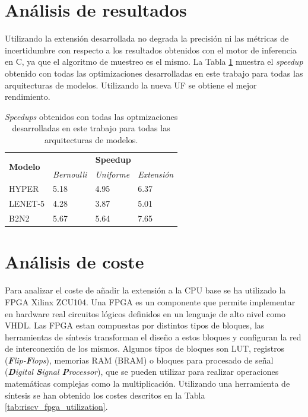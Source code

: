 
\section{Análisis de resultados}

Utilizando la extensión desarrollada no degrada la precisión ni las métricas de incertidumbre con respecto a los resultados obtenidos con el motor de inferencia en C, ya que el algoritmo de muestreo es el mismo. La Tabla \ref{tab:riscv_speedup} muestra el \textit{speedup} obtenido con todas las optimizaciones desarrolladas en este trabajo para todas las arquitecturas de modelos. Utilizando la nueva UF se obtiene el mejor rendimiento.

\begin{table}[h]
    \centering
    \caption{\textit{Speedups} obtenidos con todas las optmizaciones desarrolladas en este trabajo para todas las arquitecturas de modelos.}
    \label{tab:riscv_speedup}
    \begin{tabular}{llll}
    \hline
    \multirow{2}{*}{\textbf{Modelo}} & \multicolumn{3}{c}{\textbf{Speedup}}\\
    & \textit{Bernoulli} & \textit{Uniforme} & \textit{Extensión}\\ \hline
    HYPER& 5.18 & 4.95 & 6.37 \\
    LENET-5& 4.28 & 3.87 & 5.01 \\
    B2N2& 5.67 & 5.64 & 7.65 \\ \hline
    \end{tabular}
\end{table}

\section{Análisis de coste}

Para analizar el coste de añadir la extensión a la CPU base se ha utilizado la FPGA Xilinx ZCU104. Una FPGA es un componente que permite implementar en hardware real circuitos lógicos definidos en un lenguaje de alto nivel como VHDL. Las FPGA estan compuestas por distintos tipos de bloques, las herramientas de síntesis transforman el diseño a estos bloques y configuran la red de interconexión de los mismos. Algunos tipos de bloques son LUT, registros (\textit{\textbf{F}lip-\textbf{F}lops}), memorias RAM (BRAM) o bloques para procesado de señal (\textit{\textbf{D}igital \textbf{S}ignal \textbf{P}rocessor}), que se pueden utilizar para realizar operaciones matemáticas complejas como la multiplicación. Utilizando una herramienta de síntesis se han obtenido los costes descritos en la Tabla \ref{tab:riscv_fpga_utilization}.

